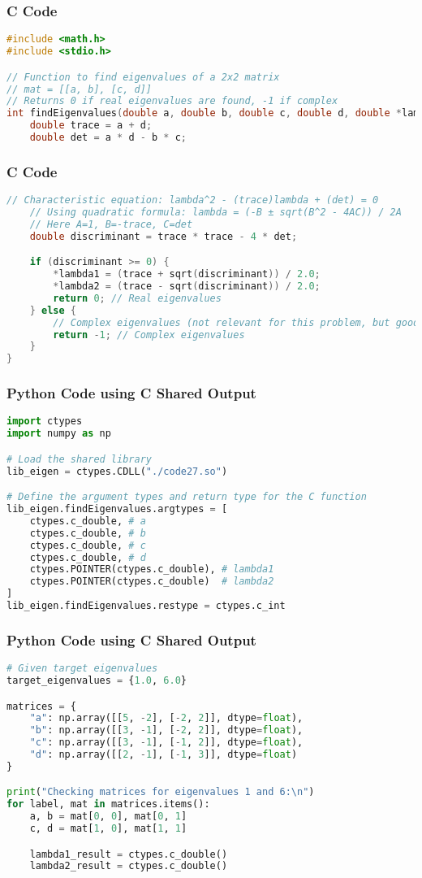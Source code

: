 \documentclass{beamer}
\begin{document}
\begin{frame}[fragile]\frametitle{C Code}
\begin{lstlisting}[language=C]
#include <math.h>
#include <stdio.h>

// Function to find eigenvalues of a 2x2 matrix
// mat = [[a, b], [c, d]]
// Returns 0 if real eigenvalues are found, -1 if complex
int findEigenvalues(double a, double b, double c, double d, double *lambda1, double *lambda2) {
    double trace = a + d;
    double det = a * d - b * c;
\end{lstlisting}
\end{frame}

\begin{frame}[fragile]\frametitle{C Code}
\begin{lstlisting}[language=C]
    // Characteristic equation: lambda^2 - (trace)lambda + (det) = 0
    // Using quadratic formula: lambda = (-B ± sqrt(B^2 - 4AC)) / 2A
    // Here A=1, B=-trace, C=det
    double discriminant = trace * trace - 4 * det;

    if (discriminant >= 0) {
        *lambda1 = (trace + sqrt(discriminant)) / 2.0;
        *lambda2 = (trace - sqrt(discriminant)) / 2.0;
        return 0; // Real eigenvalues
    } else {
        // Complex eigenvalues (not relevant for this problem, but good to handle)
        return -1; // Complex eigenvalues
    }
}
\end{lstlisting}
\end{frame}

\begin{frame}[fragile]\frametitle{Python Code using C Shared Output}
\begin{lstlisting}[language=Python]
import ctypes
import numpy as np

# Load the shared library
lib_eigen = ctypes.CDLL("./code27.so")

# Define the argument types and return type for the C function
lib_eigen.findEigenvalues.argtypes = [
    ctypes.c_double, # a
    ctypes.c_double, # b
    ctypes.c_double, # c
    ctypes.c_double, # d
    ctypes.POINTER(ctypes.c_double), # lambda1
    ctypes.POINTER(ctypes.c_double)  # lambda2
]
lib_eigen.findEigenvalues.restype = ctypes.c_int 
\end{lstlisting}
\end{frame}

\begin{frame}[fragile]\frametitle{Python Code using C Shared Output}
\begin{lstlisting}[language=Python]
# Given target eigenvalues
target_eigenvalues = {1.0, 6.0}

matrices = {
    "a": np.array([[5, -2], [-2, 2]], dtype=float),
    "b": np.array([[3, -1], [-2, 2]], dtype=float),
    "c": np.array([[3, -1], [-1, 2]], dtype=float),
    "d": np.array([[2, -1], [-1, 3]], dtype=float)
}

print("Checking matrices for eigenvalues 1 and 6:\n")
for label, mat in matrices.items():
    a, b = mat[0, 0], mat[0, 1]
    c, d = mat[1, 0], mat[1, 1]

    lambda1_result = ctypes.c_double()
    lambda2_result = ctypes.c_double()
\end{lstlisting}
\end{frame}
\end{document}
